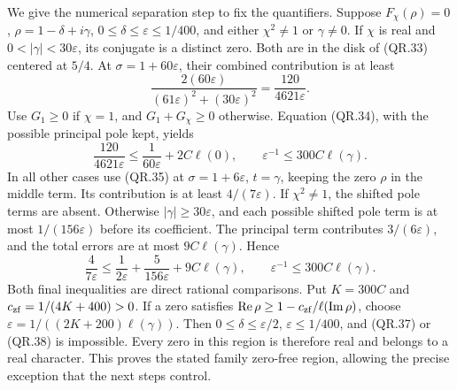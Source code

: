 We give the numerical separation step to fix the quantifiers.
Suppose $F_\chi(\rho)=0$, $\rho=1-\delta+i\gamma$,
$0\le\delta\le\varepsilon\le1/400$, and either $\chi^2\ne1$
or $\gamma\ne0$. If $\chi$ is real and
$0<|\gamma|<30\varepsilon$, its conjugate is a distinct zero.
Both are in the disk of (QR.33) centered at $5/4$.
At $\sigma=1+60\varepsilon$, their combined contribution is
at least
\[
 \frac{2(60\varepsilon)}{(61\varepsilon)^2+(30\varepsilon)^2}
                         =\frac{120}{4621\varepsilon}.
\]
Use $G_1\ge0$ if $\chi=1$, and $G_1+G_\chi\ge0$ otherwise.
Equation (QR.34), with the possible principal pole kept, yields
\[
 \frac{120}{4621\varepsilon}
          \le\frac1{60\varepsilon}+2C\ell(0),
       \qquad \varepsilon^{-1}\le300C\ell(\gamma).        \tag{QR.37}
\]
In all other cases use (QR.35) at $\sigma=1+6\varepsilon$,
$t=\gamma$, keeping the zero $\rho$ in the middle term.
Its contribution is at least $4/(7\varepsilon)$. If
$\chi^2\ne1$, the shifted pole terms are absent. Otherwise
$|\gamma|\ge30\varepsilon$, and each possible shifted pole
term is at most $1/(156\varepsilon)$ before its coefficient.
The principal term contributes $3/(6\varepsilon)$, and the
total errors are at most $9C\ell(\gamma)$. Hence
\[
 \frac4{7\varepsilon}
   \le\frac1{2\varepsilon}+\frac5{156\varepsilon}
                                  +9C\ell(\gamma),
       \qquad \varepsilon^{-1}\le300C\ell(\gamma).        \tag{QR.38}
\]
Both final inequalities are direct rational comparisons.
Put $K=300C$ and $c_{\rm zf}=1/(4K+400)>0$.
If a zero satisfies
$\operatorname{Re}\rho\ge1-c_{\rm zf}/\ell(\operatorname{Im}\rho)$,
choose $\varepsilon=1/((2K+200)\ell(\gamma))$.
Then $0\le\delta\le\varepsilon/2$, $\varepsilon\le1/400$,
and (QR.37) or (QR.38) is impossible. Every zero in this region
is therefore real and belongs to a real character. This proves
the stated family zero-free region, allowing the precise exception
that the next steps control.

